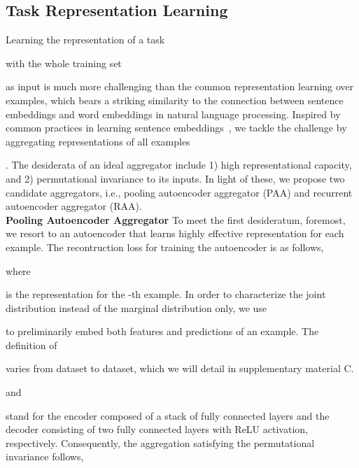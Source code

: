 \documentclass{article}
\begin{document}
\subsection{Task Representation Learning}
Learning the representation of a task \begin{small}\end{small} with
the whole training set \begin{small}\end{small} as input is much more challenging than 
the common representation learning over examples,
which bears a striking similarity to the connection between sentence embeddings and word embeddings in natural language processing. 
Inspired by common practices in learning sentence embeddings~\cite{conneau2017supervised}, we tackle the challenge by
aggregating representations of all examples \begin{small}\end{small}.
The desiderata of an ideal aggregator include 1) high representational capacity, and 2) permutational invariance to its inputs. 
In light of these, we propose two candidate aggregators, i.e., pooling autoencoder aggregator (PAA) and recurrent autoencoder aggregator (RAA).  \\
\textbf{Pooling Autoencoder Aggregator} 
To meet the first desideratum, foremost, we resort to an autoencoder that learns highly effective representation for each example. 
The recontruction loss for training the autoencoder is as follows,

where \begin{small}  \end{small} is the representation for the -th example. 
In order to characterize the joint distribution instead of the marginal distribution only, we use \begin{small}\end{small} to preliminarily embed both features and predictions of an example. 
The definition of \begin{small}\end{small} varies from dataset to dataset, which we will
detail in supplementary material C.
\begin{small}\end{small} and \begin{small}\end{small} stand for the encoder composed of a stack of fully connected layers and the decoder consisting of two fully connected layers with ReLU activation, respectively. 
Consequently, the aggregation satisfying the permutational invariance follows,
\end{document}
